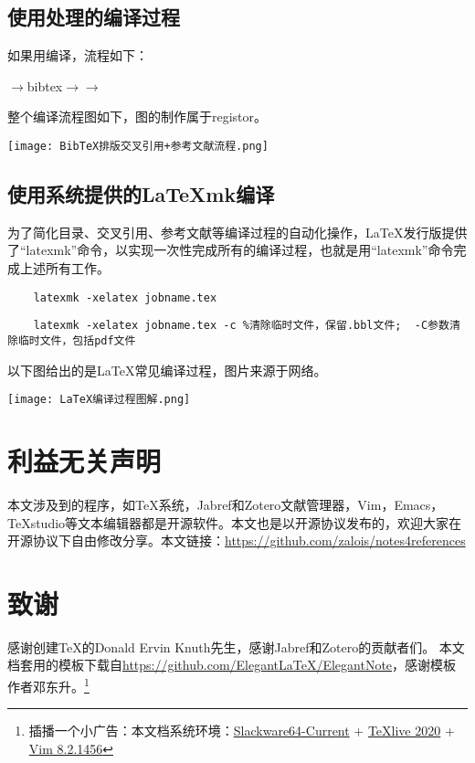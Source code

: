 \documentclass[cn,hazy,blue,14pt,geye,normal,]{elegantnote}
\begin{document}
\subsection{使用\BibTeX{}处理的编译过程}
如果用\XeLaTeX{}编译，流程如下：\par
\XeLaTeX\(\to\)bibtex\(\to\)\XeLaTeX\(\to\)\XeLaTeX\par
整个编译流程图如下，图的制作属于registor\cite{registor20190923}。\par
\texttt{[image: BibTeX排版交叉引用+参考文献流程.png]}
\subsection{使用系统提供的\LaTeX{}mk编译}
为了简化目录、交叉引用、参考文献等编译过程的自动化操作，\LaTeX{}发行版提供了``latexmk''命令，以实现一次性完成所有的编译过程，也就是用``latexmk''命令完成上述所有工作。
\begin{example}
	\begin{lstlisting}
	latexmk -xelatex jobname.tex
	\end{lstlisting}
\end{example}
\begin{example}
	\begin{lstlisting}
	latexmk -xelatex jobname.tex -c %清除临时文件，保留.bbl文件;  -C参数清除临时文件，包括pdf文件
	\end{lstlisting}
\end{example}\par
以下图给出的是\LaTeX{}常见编译过程，图片来源于网络。\par
\texttt{[image: LaTeX编译过程图解.png]}
\nocite{*}%
%
\section{利益无关声明}
本文涉及到的程序，如\TeX 系统，Jabref和Zotero文献管理器，Vim，Emacs，\TeX studio等文本编辑器都是开源软件。本文也是以开源协议发布的，欢迎大家在开源协议下自由修改分享。本文链接：\url{https://github.com/zalois/notes4references}
\section{致谢}
感谢创建\TeX 的Donald Ervin Knuth先生，感谢Jabref和Zotero的贡献者们。
本文档套用的模板下载自\href{https://github.com/ElegantLaTeX/ElegantNote}{https://github.com/Elegant\LaTeX/ElegantNote}，感谢模板作者邓东升。\footnote{插播一个小广告：本文档系统环境：\href{https://mirrors.slackware.com/slackware/slackware64-current/}{Slackware64-Current} + \href{https://www.tug.org/texlive/}{\TeX live 2020} + \href{https://www.vim.org/}{Vim 8.2.1456}}
\printbibliography[heading=bibintoc,title=参考文献]
%
%
\end{document}
